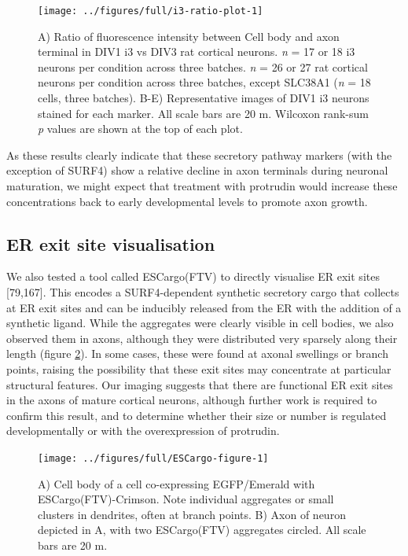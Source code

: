 \documentclass[
  12pt,
  a4paper,
]{book}
\begin{document}
\begin{figure}
\texttt{[image: ../figures/full/i3-ratio-plot-1]} \caption[Comparison of marker localisation between i3 neurons and rat cortical neurons]{A) Ratio of fluorescence intensity between Cell body and axon terminal in DIV1 i3 vs DIV3 rat cortical neurons. \emph{n} = 17 or 18 i3 neurons per condition across three batches. \emph{n} = 26 or 27 rat cortical neurons per condition across three batches, except SLC38A1 (\emph{n} = 18 cells, three batches). B-E) Representative images of DIV1 i3 neurons stained for each marker. All scale bars are 20 \textmu{}m. Wilcoxon rank-sum \emph{p} values are shown at the top of each plot.}\label{fig:i3-ratio-plot}
\end{figure}

As these results clearly indicate that these secretory pathway markers (with the exception of SURF4) show a relative decline in axon terminals during neuronal maturation, we might expect that treatment with protrudin would increase these concentrations back to early developmental levels to promote axon growth.

\hypertarget{er-exit-site-visualisation}{%
\subsection{ER exit site visualisation}\label{er-exit-site-visualisation}}

We also tested a tool called ESCargo(FTV) to directly visualise ER exit sites {[}79,167{]}. This encodes a SURF4-dependent synthetic secretory cargo that collects at ER exit sites and can be inducibly released from the ER with the addition of a synthetic ligand. While the aggregates were clearly visible in cell bodies, we also observed them in axons, although they were distributed very sparsely along their length (figure \ref{fig:ESCargo-figure}). In some cases, these were found at axonal swellings or branch points, raising the possibility that these exit sites may concentrate at particular structural features. Our imaging suggests that there are functional ER exit sites in the axons of mature cortical neurons, although further work is required to confirm this result, and to determine whether their size or number is regulated developmentally or with the overexpression of protrudin.

\begin{figure}
\texttt{[image: ../figures/full/ESCargo-figure-1]} \caption[ESCargo localisation in cortical neurons]{A) Cell body of a cell co-expressing EGFP/Emerald with ESCargo(FTV)-Crimson.  Note individual aggregates or small clusters in dendrites, often at branch points.  B) Axon of neuron depicted in A, with two ESCargo(FTV) aggregates circled.  All scale bars are 20 \textmu{}m.}\label{fig:ESCargo-figure}
\end{figure}
\end{document}

